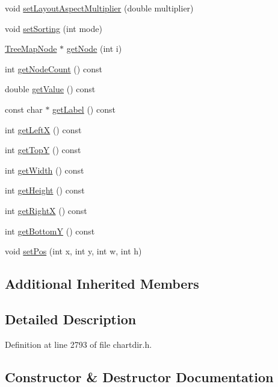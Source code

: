 \begin{DoxyCompactItemize}
void \hyperlink{class_tree_map_node_a7722b40c9891945d11110f2a9122c029}{set\+Layout\+Aspect\+Multiplier} (double multiplier)
\item 
void \hyperlink{class_tree_map_node_a74a1dc8d01616426a35aa8d5291ccaf9}{set\+Sorting} (int mode)
\item 
\hyperlink{class_tree_map_node}{Tree\+Map\+Node} $\ast$ \hyperlink{class_tree_map_node_adae867bee5a1cdf5fe3b632b9a55da65}{get\+Node} (int i)
\item 
int \hyperlink{class_tree_map_node_a7c32668676377780aa500260f69961c8}{get\+Node\+Count} () const
\item 
double \hyperlink{class_tree_map_node_a4ee3affd6ee258d92dbd562e2e474fe8}{get\+Value} () const
\item 
const char $\ast$ \hyperlink{class_tree_map_node_a716c1465852f037e6b75e14b8865b841}{get\+Label} () const
\item 
int \hyperlink{class_tree_map_node_add0c62f94c829afa5034cd0992c8f2d7}{get\+LeftX} () const
\item 
int \hyperlink{class_tree_map_node_ad7fbaaab1bbaef5246ba977af6080add}{get\+TopY} () const
\item 
int \hyperlink{class_tree_map_node_ac9cda4e3299ca56a8f7e7cf0a90e23b0}{get\+Width} () const
\item 
int \hyperlink{class_tree_map_node_ad2194072974f9c46d48be27d517fd984}{get\+Height} () const
\item 
int \hyperlink{class_tree_map_node_ab0d59ca6de7035909efbd92d33a8ea64}{get\+RightX} () const
\item 
int \hyperlink{class_tree_map_node_ae8e084cd21a03ecc16b8c70601424f19}{get\+BottomY} () const
\item 
void \hyperlink{class_tree_map_node_a739d1874f5c0496388eeeb9bd4849f49}{set\+Pos} (int x, int y, int w, int h)
\end{DoxyCompactItemize}
\subsection*{Additional Inherited Members}


\subsection{Detailed Description}


Definition at line 2793 of file chartdir.\+h.



\subsection{Constructor \& Destructor Documentation}
\mbox{\label{class_tree_map_node_ab507506bfc51ba9e0727056bae4f0b98}} 
